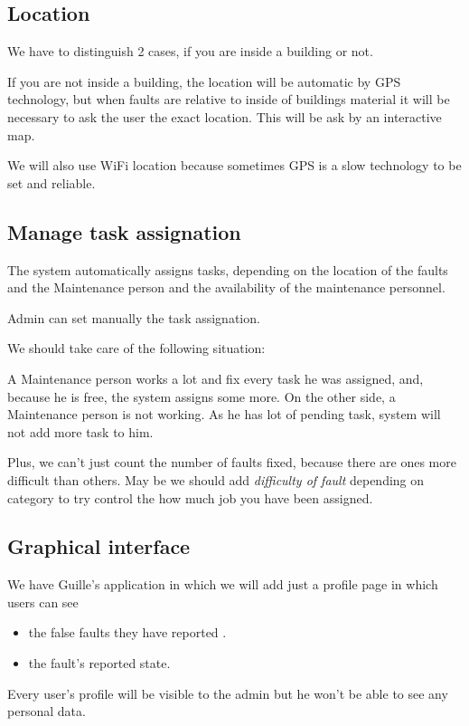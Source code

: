 \subsection{Location}

We have to distinguish 2 cases, if you are inside a building or not.

If you are not inside a building, the location will be automatic by GPS technology, but when faults are relative to inside of buildings material it will be necessary to ask the user the exact location. This will be ask by an interactive map.


We will also use WiFi location because sometimes GPS is a slow technology to be set and reliable.

\subsection{Manage task assignation}
The system automatically assigns tasks, depending on the location of the faults and the Maintenance person and the availability of the maintenance personnel.

Admin can set manually the task assignation.

We should take care of the following situation:

A Maintenance person works a lot and fix every task he was assigned, and, because he is free, the system assigns some more. On the other side, a Maintenance person is not working. As he has lot of pending task, system will not add more task to him. 

Plus, we can't just count the number of faults fixed, because there are ones more difficult than others. May be we should add \textit{difficulty of fault} depending on category to try control the how much job you have been assigned.

\subsection{Graphical interface}
We have Guille's application in which we will add just a profile page in which users can see
\begin{itemize}
\item the false faults they have reported .
\item the fault's reported state.
\end{itemize}

Every user's profile will be visible to the admin but he won't be able to see any personal data.

